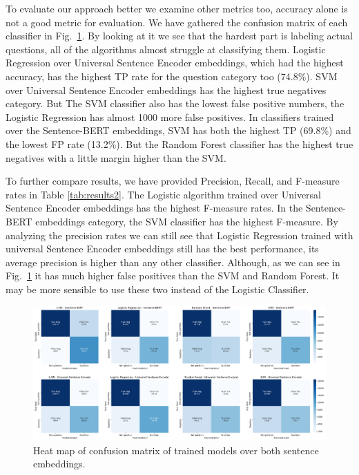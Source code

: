 \documentclass[conference]{IEEEtran}
\begin{document}
To evaluate our approach better we examine other metrics too, accuracy alone is not a good metric for 
evaluation. We have gathered the confusion matrix of each classifier in Fig.~\ref{fig:cfheatmap}. 
By looking at it we see that the hardest part is labeling actual questions, all of the algorithms almost 
struggle at classifying them. Logistic Regression over Universal Sentence Encoder embeddings, which had 
the highest accuracy, has the highest TP rate for the question category too (74.8\%). SVM over 
Universal Sentence Encoder embeddings has the highest true negatives category. 
But The SVM classifier also has the lowest false positive numbers, the Logistic Regression has almost 1000 more 
false positives. In classifiers trained over the Sentence-BERT embeddings, SVM has both the highest TP (69.8\%) 
and the lowest FP rate (13.2\%). But the Random Forest classifier has the highest true negatives with a 
little margin higher than the SVM.

To further compare results, we have provided Precision, Recall, and F-measure rates in Table \ref{tab:results2}.
The Logistic algorithm trained over Universal Sentence Encoder embeddings has the highest F-measure rates.
In the Sentence-BERT embeddings category, the SVM classifier has the highest F-measure. By analyzing the precision 
rates we can still see that Logistic Regression trained with universal Sentence Encoder embeddings still has 
the best performance, its average precision is higher than any other classifier. 
Although, as we can see in Fig.~\ref{fig:cfheatmap} it has much higher false positives than the SVM and 
Random Forest. It may be more sensible to use these two instead of the Logistic Classifier.

\begin{figure}[t]
  \centerline{\includegraphics[width=7.16in]{./figures/cf-heatmaps8.png}}
  \caption{Heat map of confusion matrix of trained models over both sentence embeddings.}
  \label{fig:cfheatmap}
\end{figure}
\end{document}
